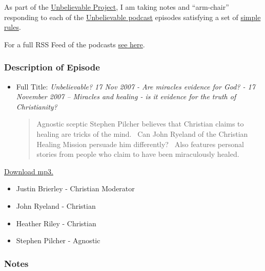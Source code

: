 As part of the
\href{https://brianblais.wordpress.com/2013/02/27/unbelievable-project-a-non-believers-armchair-perspective-on-six-years-of-christian-debates/}{Unbelievable
Project}, I am taking notes and ``arm-chair'' responding to each of the
\href{http://www.premierradio.org.uk/shows/saturday/unbelievable.aspx}{Unbelievable
podcast} episodes satisfying a set of
\href{https://brianblais.wordpress.com/2013/02/27/unbelievable-project-a-non-believers-armchair-perspective-on-six-years-of-christian-debates/}{simple
rules}.

For a full RSS Feed of the podcasts
\href{http://ondemand.premier.org.uk/unbelievable/AudioFeed.aspx}{see
here}.

\subsubsection{Description of Episode}\label{description-of-episode}

\begin{itemize}
\item
  Full Title: \emph{Unbelievable? 17 Nov 2007 - Are miracles evidence
  for God? - 17 November 2007 -- Miracles and healing - is it evidence
  for the truth of Christianity?}

  \begin{quote}
  Agnostic sceptic Stephen Pilcher believes that Christian claims to
  healing are tricks of the mind.~ Can John Ryeland of the Christian
  Healing Mission persuade him differently?~ Also features personal
  stories from people who claim to have been miraculously healed.
  \end{quote}
\end{itemize}

\href{http://media.premier.org.uk/unbelievable/ba5b6360-edf3-4218-8878-3292237289f5.mp3}{Download
mp3.}

\begin{itemize}
\itemsep1pt\parskip0pt
\item
  Justin Brierley - Christian Moderator
\item
  John Ryeland - Christian
\item
  Heather Riley - Christian
\item
  Stephen Pilcher - Agnostic
\end{itemize}

\subsubsection{Notes}\label{notes}

